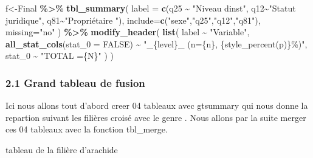 \documentclass[
]{article}
\newenvironment{Shaded}{\begin{snugshade}}{\end{snugshade}}
\newcommand{\AttributeTok}[1]{\textcolor[rgb]{0.13,0.29,0.53}{#1}}
\newcommand{\ConstantTok}[1]{\textcolor[rgb]{0.56,0.35,0.01}{#1}}
\newcommand{\FunctionTok}[1]{\textcolor[rgb]{0.13,0.29,0.53}{\textbf{#1}}}
\newcommand{\NormalTok}[1]{#1}
\newcommand{\OtherTok}[1]{\textcolor[rgb]{0.56,0.35,0.01}{#1}}
\newcommand{\SpecialCharTok}[1]{\textcolor[rgb]{0.81,0.36,0.00}{\textbf{#1}}}
\newcommand{\StringTok}[1]{\textcolor[rgb]{0.31,0.60,0.02}{#1}}
\begin{document}
\begin{Shaded}
\begin{Highlighting}[]
\NormalTok{f}\OtherTok{\textless{}{-}}\NormalTok{Final }\SpecialCharTok{\%\textgreater{}\%}
   \FunctionTok{tbl\_summary}\NormalTok{(}
                  \AttributeTok{label =} \FunctionTok{c}\NormalTok{(q25 }\SpecialCharTok{\textasciitilde{}} \StringTok{"Niveau d\textquotesingle{}inst"}\NormalTok{,}
\NormalTok{                  q12}\SpecialCharTok{\textasciitilde{}}\StringTok{"Statut juridique"}\NormalTok{,}
\NormalTok{                  q81}\SpecialCharTok{\textasciitilde{}}\StringTok{"Propriétaire "}\NormalTok{),}
                  \AttributeTok{include=}\FunctionTok{c}\NormalTok{(}\StringTok{"sexe"}\NormalTok{,}\StringTok{"q25"}\NormalTok{,}\StringTok{"q12"}\NormalTok{,}\StringTok{"q81"}\NormalTok{),}
                  \AttributeTok{missing=}\StringTok{"no"}\NormalTok{ ) }\SpecialCharTok{\%\textgreater{}\%} 
   \FunctionTok{modify\_header}\NormalTok{(}
    \FunctionTok{list}\NormalTok{(}
\NormalTok{      label }\SpecialCharTok{\textasciitilde{}} \StringTok{"Variable"}\NormalTok{,}
      \FunctionTok{all\_stat\_cols}\NormalTok{(}\AttributeTok{stat\_0 =} \ConstantTok{FALSE}\NormalTok{) }\SpecialCharTok{\textasciitilde{}} \StringTok{"\_\{level\}\_ (n=\{n\}, \{style\_percent(p)\}\%)"}\NormalTok{,}
\NormalTok{      stat\_0 }\SpecialCharTok{\textasciitilde{}} \StringTok{"TOTAL =\{N\}"}
\NormalTok{    )}
\NormalTok{  ) }
\end{Highlighting}
\end{Shaded}

\hypertarget{grand-tableau-de-fusion}{%
\subsubsection{2.1 Grand tableau de
fusion}\label{grand-tableau-de-fusion}}

Ici nous allons tout d'abord creer 04 tableaux avec gtsummary qui nous
donne la repartion suivant les filières croisé avec le genre . Nous
allons par la suite merger ces 04 tableaux avec la fonction tbl\_merge.

tableau de la filière d'arachide
\end{document}
